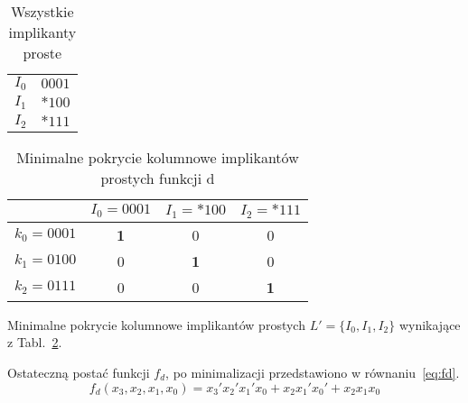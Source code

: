 \begin{table}[H]
    \centering
    \begin{tabular}[t]{ |c|c| }
        \hline
        $I_0$ & $0001$ \\
        $I_1$ & ${*}100$ \\
        $I_2$ & ${*}111$ \\
        \hline
    \end{tabular}
    \caption{Wszystkie implikanty proste} \label{tab:all-implicantsd}
\end{table}

\begin{table}[H]
    \centering
    \begin{tabular}[t]{ |c||c|c|c| }
        \hline
        & $I_0 = 0001$ & $I_1 = {*}100$ & $I_2 = {*}111$ \\
        \hline
        \hline
        $k_0 = 0001$ & \textbf{1} & 0 & 0 \\
        \hline
        $k_1 = 0100$ & 0 & \textbf{1} &  0 \\
        \hline
        $k_2 = 0111$ & 0 & 0 & \textbf{1} \\
        \hline
    \end{tabular}
    \caption{Minimalne pokrycie kolumnowe implikantów prostych funkcji d}
    \label{tab:min-blockd}
\end{table}
Minimalne pokrycie kolumnowe implikantów prostych $L' = \{I_0, I_1, I_2\}$ wynikające z Tabl.~\ref{tab:min-blockd}.

Ostateczną postać funkcji $f_d$, po minimalizacji przedstawiono w równaniu~\ref{eq:fd}.
\begin{equation}
    \label{eq:fd}
    f_d(x_3, x_2, x_1, x_0) = x_3'x_2'x_1'x_0 + x_{2}x_1'x_0' + x_{2}x_{1}x_{0}
\end{equation}
